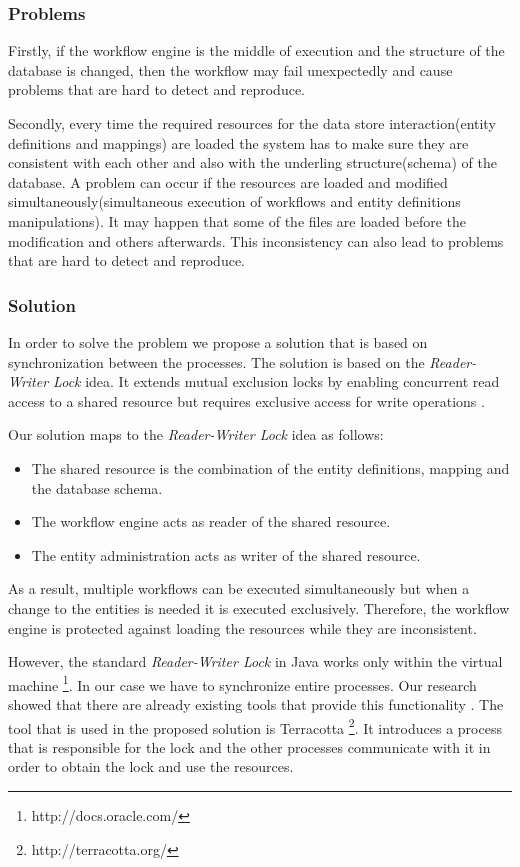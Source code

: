 \subsubsection{Problems}
Firstly, if the workflow engine is the middle of execution and the structure of the database is changed, then the workflow may fail unexpectedly and cause problems that are hard to detect and reproduce. 

Secondly, every time the required resources for the data store interaction(entity definitions and mappings) are loaded the system has to make sure they are consistent with each other and also with the underling structure(schema) of the database. A problem can occur if the resources are loaded and modified simultaneously(simultaneous execution of workflows and entity definitions manipulations). It may happen that some of the files are loaded before the modification and others afterwards. This inconsistency can also lead to problems that are hard to detect and reproduce.

\subsubsection{Solution}

In order to solve the problem we propose a solution that is based on synchronization between the processes. The solution is based on the \textit{Reader-Writer Lock} idea. It extends mutual exclusion locks by enabling concurrent read access to a shared resource but requires exclusive access for write operations \cite{lev2009scalable}.

Our solution maps to the \textit{Reader-Writer Lock} idea as follows:
\begin{itemize}
	\item The shared resource is the combination of the entity definitions, mapping and the database schema.
	\item The workflow engine acts as reader of the shared resource.
	\item The entity administration acts as writer of the shared resource.
\end{itemize}
As a result, multiple workflows can be executed simultaneously but when a change to the entities is needed it is executed exclusively. Therefore, the workflow engine is protected against loading the resources while they are inconsistent.

However, the standard \textit{Reader-Writer Lock} in Java works only within the virtual machine \footnote{http://docs.oracle.com/}. In our case we have to synchronize entire processes. Our research showed that there are already existing tools that provide this functionality \cite{hernane2012dynamic}. The tool that is used in the proposed solution is Terracotta \footnote{http://terracotta.org/}. It introduces a process that is responsible for the lock and the other processes communicate with it in order to obtain the lock and use the resources.


